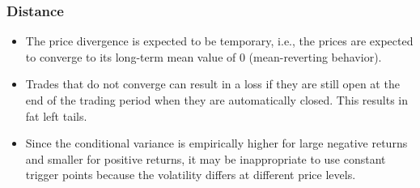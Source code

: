 \documentclass[pdf,9pt,xcolor=dvipsnames,hide notes]{beamer}
\begin{document}
\begin{frame}[label=frame2d]
	\frametitle{Distance}
	
	\begin{itemize}
		\justifying
		
		\item The price divergence is expected to be temporary, i.e., the prices are expected to converge to its long-term mean value of 0 (mean-reverting behavior). 
		
		
	
		\vspace{0.3cm}
		
		\item Trades that do not converge can result in a loss if they are still open at the end of the trading period when they are automatically closed. This results in fat left tails.
		
		\vspace{0.3cm}
		
		\item Since the conditional variance is empirically higher for large negative returns and smaller for positive returns, it may be inappropriate to use constant trigger points because the volatility differs at different price levels.
		
	\end{itemize}
	
\end{frame}
\end{document}
